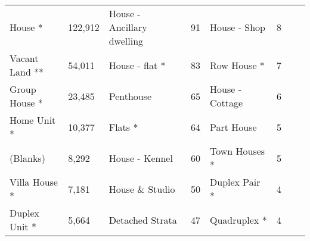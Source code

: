 \begin{table}[ht]
{\begin{threeparttable}
\begin{tabular}{llllllll}
House *                   &122,912 &House - Ancillary dwelling &91   &House - Shop	             &8\\    		
Vacant Land **            &54,011  &House - flat *	           &83   &Row House *  	             &7\\	
Group House *             &23,485  &Penthouse   	       	   &65   &House - Cottage	         &6\\
Home Unit *               &10,377  &Flats *                    &64   &Part House  	             &5\\
(Blanks)                  &8,292   &House - Kennel	           &60   &Town Houses *              &5\\
Villa House *             &7,181   &House \& Studio     	   &50	 &Duplex Pair *              &4\\		
Duplex Unit *             &5,664   &Detached Strata 	       &47   &Quadruplex *               &4\\		

\end{tabular}
\end{threeparttable}}
\end{table}
